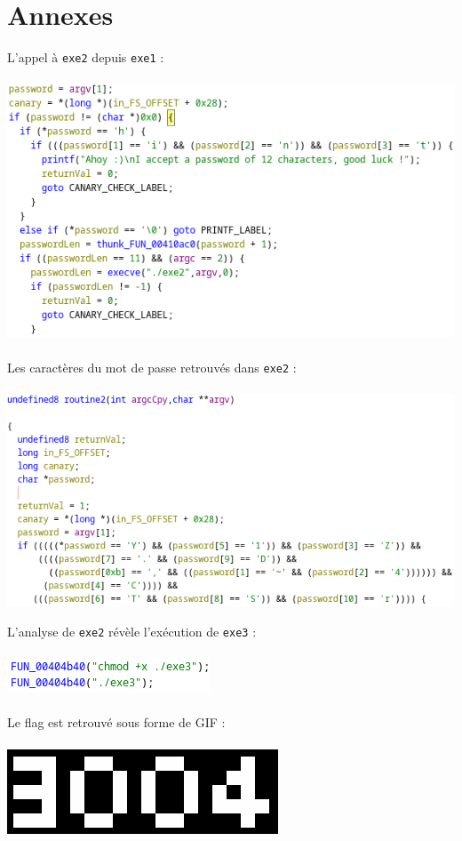\documentclass[12pt]{article}
\begin{document}
  \section{Annexes}
  L'appel à \texttt{exe2} depuis \texttt{exe1} : \\
  \\
  \includegraphics{"./1.png"}\\
  \\
  Les caractères du mot de passe retrouvés dans \texttt{exe2} : \\
  \\
  \includegraphics{"./2.png"}
 
  \newpage

  L'analyse de \texttt{exe2} révèle l'exécution de \texttt{exe3} : \\
  \\
  \includegraphics{"./3.png"}\\
  \\
  Le flag est retrouvé sous forme de GIF : \\
  \\
  \includegraphics{"./4.png"}
\end{document}
